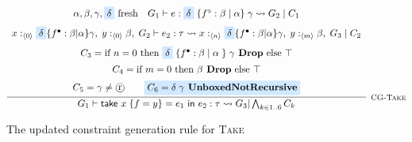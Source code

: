 \begin{figure}
    \centering
    \[
        \infer[\textsc{\footnotesize{CG-Take}}]{
            G_1 \vdash \textsf{take } x\; \{ f = y \} = e_1 \textsf{ in } e_2
                : \tau \rightsquigarrow G_3 | \bigwedge_{k \in 1..6} C_k
        }{
            \begin{array}{c}
                \alpha, \beta, \gamma, \colorbox{highlighteq}{$\delta$} \text{ fresh}
                \hspace{1em}
                G_1 \vdash e : \colorbox{highlighteq}{$\delta$}\; \{ f^\circ : \beta\; |\; \alpha \}\;
                    \gamma \rightsquigarrow G_2\; |\; C_1 \\[7pt]
                x :_{\langle 0 \rangle} \colorbox{highlighteq}{$\delta$} \{ f^\bullet : \beta | \alpha \} \gamma,\;
                    y :_{\langle 0 \rangle} \beta,\;
                    G_2 \vdash e_2 : \tau 
                     \rightsquigarrow     
                    x :_{\langle n \rangle} \colorbox{highlighteq}{$\delta$} \{ f^\bullet : \beta | \alpha \} \gamma,\;
                    y :_{\langle m \rangle} \beta,\;
                    G_3\; |\; C_2 \\[7pt]
                C_3 = \text{if } n = 0 \text{ then } 
                    \colorbox{highlighteq}{$\delta$}\; \{ f^\bullet : \beta\; |\; \alpha\; \}\; \gamma \textbf{ Drop}
                    \text{ else } \top \\[5pt]
                C_4 = \text{if } m = 0 \text{ then } 
                    \beta \textbf{ Drop}
                    \text{ else } \top \\[5pt]
                C_5 = \gamma \neq \text{\textcircled{r}}
                \hspace{2em}
                \colorbox{highlighteq}{$C_6 = \delta\; \gamma \textbf{ UnboxedNotRecursive}$}
            \end{array}
        }
    \]
    
    \caption{The updated constraint generation rule for \textsc{Take}}
    \label{fig:takeconstraintgen}
\end{figure}

